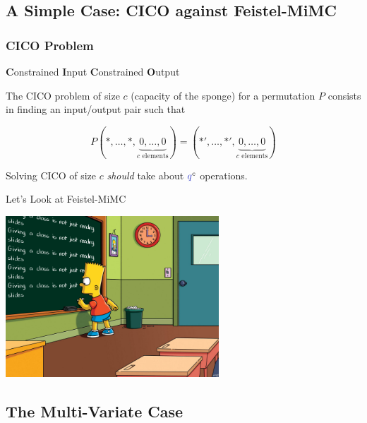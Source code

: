 \documentclass[aspectratio=169]{beamer}
\begin{document}
\subsection{A Simple Case: CICO against Feistel-MiMC}


\begin{frame}
  \frametitle{CICO Problem}

  \begin{center}
    \textbf{C}onstrained \textbf{I}nput \textbf{C}onstrained \textbf{O}utput
  \end{center}
  
  The CICO problem of size $c$ (capacity of the sponge) for a permutation $P$ consists in finding an input/output pair such that
  \begin{Large}
    \[ P(*,\ldots,*,\underbrace{0,\ldots,0}_{c \text{ elements}}) = (*',\ldots,*',\underbrace{0,\ldots,0}_{c \text{ elements}}) \]
  \end{Large}

  \pause 
  Solving CICO of size $c$ \emph{should} take about ${\color{blue}q}^{c}$ operations.
\end{frame}


\begin{frame}{Let's Look at Feistel-MiMC}
  \vfill

  \begin{center}
    \includegraphics[width=8cm]{./figures/simpsons}
  \end{center}
  
  \vfill
\end{frame}


\subsection{The Multi-Variate Case}
\end{document}

